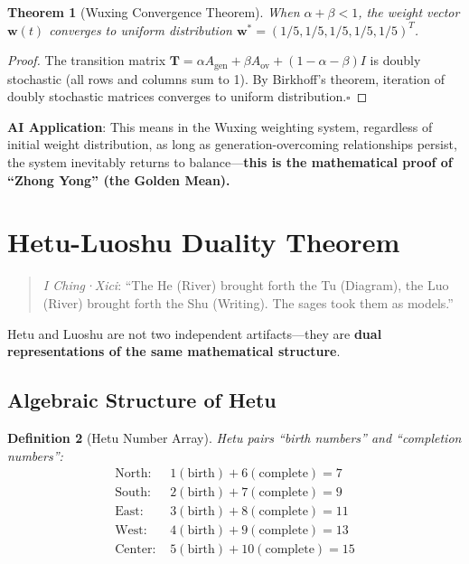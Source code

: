 \documentclass[conference]{IEEEtran}
\newtheorem{theorem}{Theorem}[section]
\newtheorem{definition}[theorem]{Definition}
\theoremstyle{remark}
\begin{document}
\begin{theorem}[Wuxing Convergence Theorem]
When $\alpha+\beta < 1$, the weight vector $\mathbf{w}(t)$ converges to uniform distribution $\mathbf{w}^* = (1/5, 1/5, 1/5, 1/5, 1/5)^T$.
\end{theorem}
\begin{proof}
The transition matrix $\mathbf{T} = \alpha A_{\text{gen}} + \beta A_{\text{ov}} + (1-\alpha-\beta)I$ is doubly stochastic (all rows and columns sum to 1). By Birkhoff's theorem, iteration of doubly stochastic matrices converges to uniform distribution.\hfill$\square$
\end{proof}

\textbf{AI Application}: This means in the Wuxing weighting system, regardless of initial weight distribution, as long as generation-overcoming relationships persist, the system inevitably returns to balance---\textbf{this is the mathematical proof of ``Zhong Yong'' (the Golden Mean).}

\section{Hetu-Luoshu Duality Theorem}

\begin{quote}
\emph{I Ching·Xici}: ``The He (River) brought forth the Tu (Diagram), the Luo (River) brought forth the Shu (Writing). The sages took them as models.''
\end{quote}

Hetu and Luoshu are not two independent artifacts---they are \textbf{dual representations of the same mathematical structure}.

\subsection{Algebraic Structure of Hetu}

\begin{definition}[Hetu Number Array]
Hetu pairs ``birth numbers'' and ``completion numbers'':
\begin{align*}
\text{North: }& 1(\text{birth}) + 6(\text{complete}) = 7\\
\text{South: }& 2(\text{birth}) + 7(\text{complete}) = 9\\
\text{East: }& 3(\text{birth}) + 8(\text{complete}) = 11\\
\text{West: }& 4(\text{birth}) + 9(\text{complete}) = 13\\
\text{Center: }& 5(\text{birth}) + 10(\text{complete}) = 15
\end{align*}
\end{definition}
\end{document}
